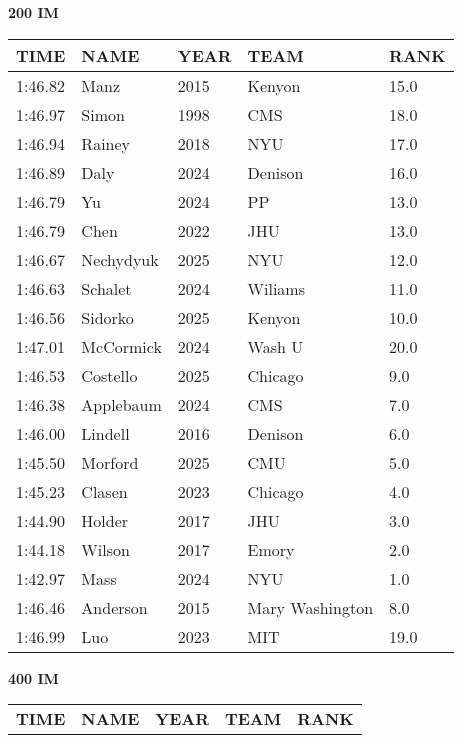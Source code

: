 \begin{table}[H]
\centering
\begin{minipage}[t]{0.48\textwidth}
\centering
\textbf{200 IM}\\[0.1cm]
\begin{tabular}{@{}p{1.8cm}p{2.8cm}p{1.2cm}p{1.4cm}p{0.8cm}@{}}
\hline
    \textbf{TIME} & \textbf{NAME} & \textbf{YEAR} & \textbf{TEAM} & \textbf{RANK} \\
\hline
    1:46.82 & Manz & 2015 & Kenyon & 15.0 \\
    1:46.97 & Simon & 1998 & CMS & 18.0 \\
    1:46.94 & Rainey & 2018 & NYU & 17.0 \\
    1:46.89 & Daly & 2024 & Denison & 16.0 \\
    1:46.79 & Yu & 2024 & PP & 13.0 \\
    1:46.79 & Chen & 2022 & JHU & 13.0 \\
    1:46.67 & Nechydyuk & 2025 & NYU & 12.0 \\
    1:46.63 & Schalet & 2024 & Wiliams & 11.0 \\
    1:46.56 & Sidorko & 2025 & Kenyon & 10.0 \\
    1:47.01 & McCormick & 2024 & Wash U & 20.0 \\
    1:46.53 & Costello & 2025 & Chicago & 9.0 \\
    1:46.38 & Applebaum & 2024 & CMS & 7.0 \\
    1:46.00 & Lindell & 2016 & Denison & 6.0 \\
    1:45.50 & Morford & 2025 & CMU & 5.0 \\
    1:45.23 & Clasen & 2023 & Chicago & 4.0 \\
    1:44.90 & Holder & 2017 & JHU & 3.0 \\
    1:44.18 & Wilson & 2017 & Emory & 2.0 \\
    1:42.97 & Mass & 2024 & NYU & 1.0 \\
    1:46.46 & Anderson & 2015 & Mary Washington & 8.0 \\
    1:46.99 & Luo & 2023 & MIT & 19.0 \\
\hline
\end{tabular}
\end{minipage}\hfill
\begin{minipage}[t]{0.48\textwidth}
\centering
\textbf{400 IM}\\[0.1cm]
\begin{tabular}{@{}p{1.8cm}p{2.8cm}p{1.2cm}p{1.4cm}p{0.8cm}@{}}
\hline
    \textbf{TIME} & \textbf{NAME} & \textbf{YEAR} & \textbf{TEAM} & \textbf{RANK} \\

\end{tabular}
\end{minipage}
\end{table}
